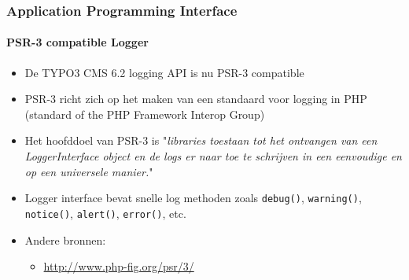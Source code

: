 \begin{frame}[fragile]
	\frametitle{Application Programming Interface}
	\framesubtitle{PSR-3 compatible Logger}

	\begin{itemize}
		\item De TYPO3 CMS 6.2 logging API is nu PSR-3 compatible
		\item PSR-3 richt zich op het maken van een standaard voor logging in PHP (standard of the PHP Framework Interop Group)

		\item Het hoofddoel van PSR-3 is
			"\emph{libraries toestaan tot het ontvangen van een LoggerInterface object en de logs er naar toe te schrijven in een eenvoudige en op een universele manier.}"

		\item Logger interface bevat snelle log methoden zoals\newline
			\texttt{debug()}, \texttt{warning()}, \texttt{notice()}, \texttt{alert()}, \texttt{error()}, etc.

		\item  Andere bronnen:
			\begin{itemize}
				\item \url{http://www.php-fig.org/psr/3/}
			\end{itemize}

	\end{itemize}

\end{frame}


